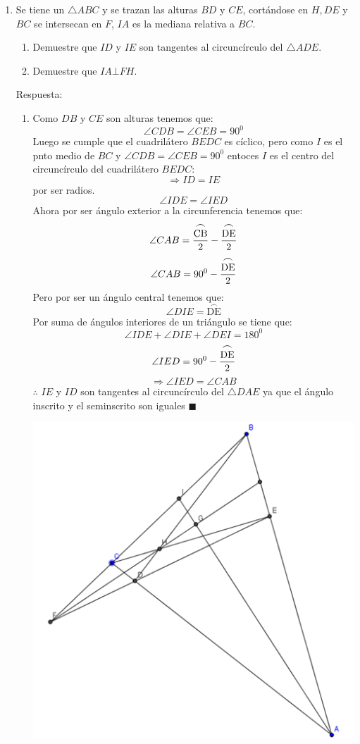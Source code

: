 \documentclass{book}
\begin{document}
\begin{enumerate}
    \item Se tiene un $\triangle ABC$ y se trazan las alturas $BD$ y $CE$, cortándose en $H,DE$ y $BC$ se intersecan en $F$, $IA$ es la mediana relativa a $BC$.
          \begin{enumerate}
              \item Demuestre que $ID$ y $IE$ son tangentes al circuncírculo del $\triangle ADE$.
              \item Demuestre que $IA \bot FH$.
          \end{enumerate}
          Respuesta:
          \begin{enumerate}
              \item Como $DB$ y $CE$ son alturas tenemos que:
                    $$\angle CDB=\angle CEB=90^0$$
                    Luego se cumple que el cuadrilátero $BEDC$ es cíclico, pero como $I$ es el pnto medio de $BC$ y $\angle CDB=\angle CEB=90^0$ entoces $I$ es el centro del circuncírculo del cuadrilátero $BEDC$:
                    $$\Rightarrow ID=IE$$
                    por ser radios.
                    $$\angle IDE=\angle IED$$
                    Ahora por ser ángulo exterior a la circunferencia tenemos que:
                    $$\angle CAB={\stackrel{\textstyle\frown}{\mathrm{CB}}\over 2}-{\stackrel{\textstyle\frown}{\mathrm{DE}}\over 2}$$
                    $$\angle CAB=90^0-{\stackrel{\textstyle\frown}{\mathrm{DE}}\over 2}$$
                    Pero por ser un ángulo central tenemos que:
                    $$\angle DIE=\stackrel{\textstyle\frown}{\mathrm{DE}}$$
                    Por suma de ángulos interiores de un triángulo se tiene que:
                    $$\angle IDE+\angle DIE+\angle DEI=180^0$$
                    $$\angle IED=90^0-{\stackrel{\textstyle\frown}{\mathrm{DE}}\over 2}$$
                    $$\Rightarrow\angle IED=\angle CAB$$
                    $\therefore$ $IE$ y $ID$ son tangentes al circuncírculo del $\triangle DAE$ ya que el ángulo inscrito y el seminscrito son iguales $\blacksquare$
                    \begin{center}
                        \includegraphics[scale=1]{imagenes/Geometria/23.png}

\end{center}
\end{enumerate}
\end{enumerate}
\end{document}
